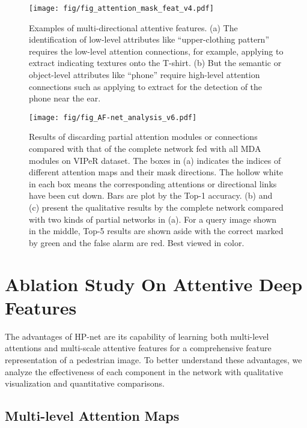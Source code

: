 \documentclass[10pt,twocolumn,letterpaper]{article}
\begin{document}
\begin{figure}[t]
\centering
\texttt{[image: fig/fig\_attention\_mask\_feat\_v4.pdf]}
\caption{
Examples of multi-directional attentive features.
(a) The identification of low-level attributes like ``upper-clothing pattern'' requires the low-level attention connections, for example, applying  to extract  indicating textures onto the T-shirt. (b) But the semantic or object-level attributes like ``phone'' require high-level attention connections such as applying  to extract  for the detection of the phone near the ear.
}
\label{fig:attention_mask_feat}
\end{figure}




\begin{figure*}[t]
\centering
\texttt{[image: fig/fig\_AF-net\_analysis\_v6.pdf]}
\caption{Results of discarding partial attention modules or connections compared with that of the complete network fed with all MDA modules on VIPeR dataset. The  boxes in (a) indicates the indices of different attention maps and their mask directions. The hollow white in each box means the corresponding attentions or directional links have been cut down. Bars are plot by the Top-1 accuracy. (b) and (c) present the qualitative results by the complete network compared with two kinds of partial networks in (a). For a query image shown in the middle, Top-5 results are shown aside with the correct marked by green and the false alarm are red. Best viewed in color.
}
\label{fig:AF-net_analysis}
\end{figure*}




\section{Ablation Study On Attentive Deep Features}
\label{sec:ablation_study}

The advantages of HP-net are its capability of learning both multi-level attentions and multi-scale attentive features for a comprehensive feature representation of a pedestrian image.
To better understand these advantages, we analyze the effectiveness of each component in the network with qualitative visualization and quantitative comparisons.

\subsection{Multi-level Attention Maps}
\label{subsec:multi_level_attention_maps}
\end{document}
